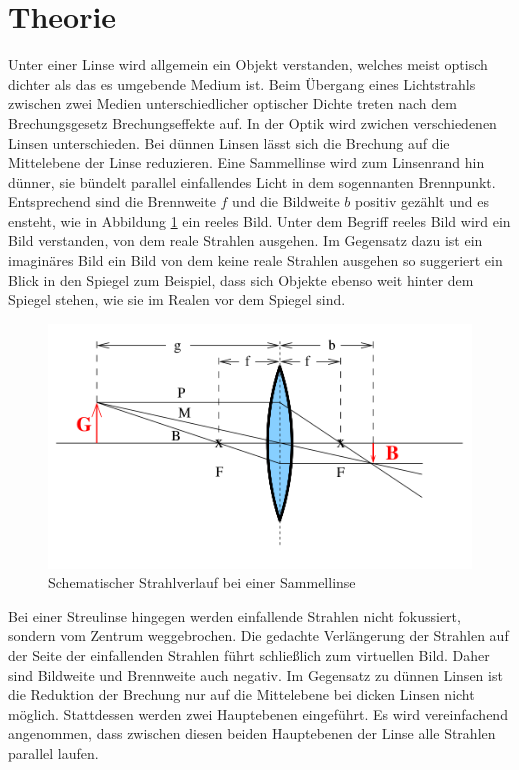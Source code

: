 \section{Theorie}
\label{sec:Theorie}
Unter einer Linse wird allgemein ein Objekt verstanden, welches meist optisch dichter als das es umgebende Medium ist.
Beim Übergang eines Lichtstrahls zwischen zwei Medien unterschiedlicher optischer Dichte treten nach dem Brechungsgesetz Brechungseffekte auf.
In der Optik wird zwichen verschiedenen Linsen unterschieden.
Bei dünnen Linsen lässt sich die Brechung auf die Mittelebene der Linse reduzieren.
Eine Sammellinse wird zum Linsenrand hin dünner, sie bündelt parallel einfallendes Licht in dem sogennanten Brennpunkt. Entsprechend sind die Brennweite $f$ und die Bildweite $b$ positiv gezählt und es ensteht, wie in Abbildung \ref{fig:sammelli} ein reeles Bild.
Unter dem Begriff reeles Bild wird ein Bild verstanden, von dem reale Strahlen ausgehen. Im Gegensatz dazu ist ein imaginäres Bild ein Bild von dem keine reale Strahlen ausgehen so suggeriert ein Blick in den Spiegel zum Beispiel, dass sich Objekte ebenso weit hinter dem Spiegel stehen, wie sie im Realen vor dem Spiegel sind.
\begin{figure}
  \includegraphics[width=\linewidth]{Bilder/sammellinse.png}
  \caption{Schematischer Strahlverlauf bei einer Sammellinse \cite{Anleitung}}
  \label{fig:sammelli}
\end{figure}
Bei einer Streulinse hingegen werden einfallende Strahlen nicht fokussiert, sondern vom Zentrum weggebrochen. Die gedachte Verlängerung der Strahlen auf der Seite der einfallenden Strahlen führt schließlich zum virtuellen Bild. Daher sind Bildweite und Brennweite auch negativ.
Im Gegensatz zu dünnen Linsen ist die Reduktion der Brechung nur auf die Mittelebene bei dicken Linsen nicht möglich. Stattdessen werden zwei Hauptebenen eingeführt.
Es wird vereinfachend angenommen, dass zwischen diesen beiden Hauptebenen der Linse alle Strahlen parallel laufen.

